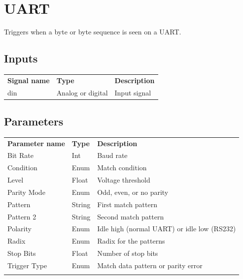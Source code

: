 \section{UART}

Triggers when a byte or byte sequence is seen on a UART.

\subsection{Inputs}

\begin{tabularx}{16cm}{llX}
\thickhline
\textbf{Signal name} & \textbf{Type} & \textbf{Description} \\
\thickhline
din & Analog or digital & Input signal \\
\end{tabularx}

\subsection{Parameters}

\begin{tabularx}{16cm}{llX}
\thickhline
\textbf{Parameter name} & \textbf{Type} & \textbf{Description} \\
\thickhline
Bit Rate & Int & Baud rate \\
\thickhline
Condition & Enum & Match condition \\
\thickhline
Level & Float & Voltage threshold\\
\thickhline
Parity Mode & Enum & Odd, even, or no parity \\
\thickhline
Pattern & String & First match pattern\\
\thickhline
Pattern 2 & String & Second match pattern \\
\thickhline
Polarity & Enum & Idle high (normal UART) or idle low (RS232)\\
\thickhline
Radix & Enum & Radix for the patterns\\
\thickhline
Stop Bits & Float & Number of stop bits\\
\thickhline
Trigger Type & Enum & Match data pattern or parity error\\
\thickhline
\end{tabularx}


